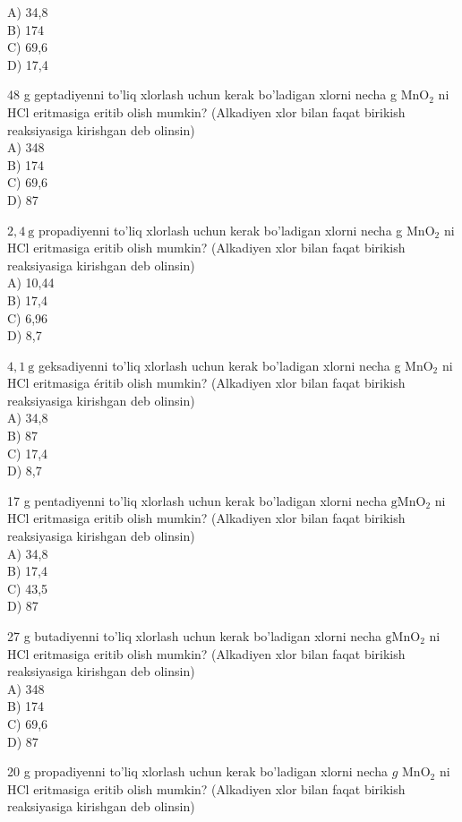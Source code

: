 A) 34,8\\
B) 174\\
C) 69,6\\
D) 17,4
  \item 48 g geptadiyenni to'liq xlorlash uchun kerak bo'ladigan xlorni necha g $\mathrm{MnO}_{2}$ ni HCl eritmasiga eritib olish mumkin? (Alkadiyen xlor bilan faqat birikish reaksiyasiga kirishgan deb olinsin)\\
A) 348\\
B) 174\\
C) 69,6\\
D) 87
  \item $2,4 \mathrm{~g}$ propadiyenni to'liq xlorlash uchun kerak bo'ladigan xlorni necha g $\mathrm{MnO}_{2}$ ni HCl eritmasiga eritib olish mumkin? (Alkadiyen xlor bilan faqat birikish reaksiyasiga kirishgan deb olinsin)\\
A) 10,44\\
B) 17,4\\
C) 6,96\\
D) 8,7
  \item $4,1 \mathrm{~g}$ geksadiyenni to'liq xlorlash uchun kerak bo'ladigan xlorni necha g $\mathrm{MnO}_{2}$ ni HCl eritmasiga éritib olish mumkin? (Alkadiyen xlor bilan faqat birikish reaksiyasiga kirishgan deb olinsin)\\
A) 34,8\\
B) 87\\
C) 17,4\\
D) 8,7
  \item 17 g pentadiyenni to'liq xlorlash uchun kerak bo'ladigan xlorni necha $\mathrm{g} \mathrm{MnO}_{2}$ ni HCl eritmasiga eritib olish mumkin? (Alkadiyen xlor bilan faqat birikish reaksiyasiga kirishgan deb olinsin)\\
A) 34,8\\
B) 17,4\\
C) 43,5\\
D) 87
  \item 27 g butadiyenni to'liq xlorlash uchun kerak bo'ladigan xlorni necha $\mathrm{g} \mathrm{MnO}_{2}$ ni HCl eritmasiga eritib olish mumkin? (Alkadiyen xlor bilan faqat birikish reaksiyasiga kirishgan deb olinsin)\\
A) 348\\
B) 174\\
C) 69,6\\
D) 87
  \item 20 g propadiyenni to'liq xlorlash uchun kerak bo'ladigan xlorni necha $g$ $\mathrm{MnO}_{2}$ ni HCl eritmasiga eritib olish mumkin? (Alkadiyen xlor bilan faqat birikish reaksiyasiga kirishgan deb olinsin)\\
